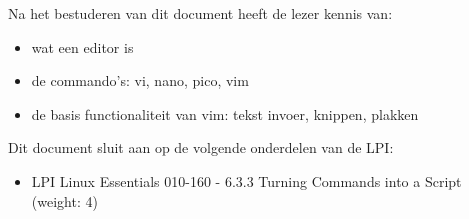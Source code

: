 Na het bestuderen van dit document heeft de lezer kennis van:
\begin{itemize}
\item wat een editor is
\item de commando's: vi, nano, pico, vim
\item de basis functionaliteit van vim: tekst invoer, knippen, plakken
\end{itemize}

Dit document sluit aan op de volgende onderdelen van de LPI:
\begin{itemize}
\item LPI Linux Essentials 010-160 - 6.3.3 Turning Commands into a Script (weight: 4)
\end{itemize}

